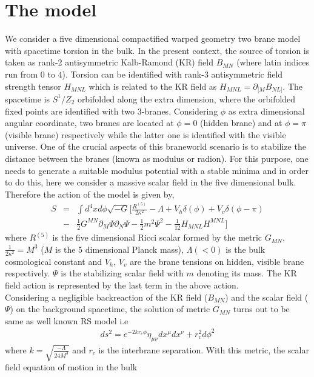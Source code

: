 \documentclass[a4paper]{article}
\begin{document}
\section{The model}
We consider a five dimensional compactified warped geometry two brane model with spacetime torsion in the bulk. In the present 
context, the source of torsion is taken as rank-2 antisymmetric Kalb-Ramond (KR) field $B_{MN}$ (where latin indices 
run from $0$ to $4$). Torsion can be identified with rank-3 antisymmetric field strength tensor $H_{MNL}$ which is related 
to the KR field as $H_{MNL}=\partial_{[M}B_{NL]}$. The spacetime is $S^1/Z_2$ orbifolded along the extra dimension, where 
the orbifolded fixed points are identified with two 3-branes. 
Considering $\phi$ as extra dimensional angular coordinate, two branes are located at $\phi=0$ (hidden brane) and at $\phi=\pi$ (visible brane) 
respectively while the latter one is identified with the visible universe. 
One of the crucial aspects of this braneworld scenario is to stabilize the distance between the branes 
(known as modulus or radion). For this purpose, one needs to generate a suitable modulus potential with a stable minima and in 
order to do this, here we consider a massive scalar field in the five dimensional bulk. Therefore the action of the model is given by, 
\begin{eqnarray}
 S&=&\int d^4xd\phi \sqrt{-G} \bigg[\frac{R^{(5)}}{2\kappa^2} - \Lambda + V_h\delta(\phi) + V_v\delta(\phi-\pi)\nonumber\\
 &-&\frac{1}{2}G^{MN}\partial_M\Psi\partial_N\Psi - \frac{1}{2}m^2\Psi^2 - \frac{1}{12}H_{MNL}H^{MNL}\bigg]
 \label{5d action}
\end{eqnarray}
where $R^{(5)}$ is the five dimensional Ricci scalar formed by the metric $G_{MN}$, $\frac{1}{2\kappa^2}=M^3$ ($M$ is the 5 dimensional 
Planck mass), $\Lambda (<0)$ is the bulk cosmological constant 
and $V_h$, $V_v$ are the brane tensions on hidden, visible brane respectively. $\Psi$ is the stabilizing scalar field with 
$m$ denoting its mass. The KR field action is represented by the last term in the above action.\\
Considering a negligible backreaction of the KR field ($B_{MN}$) and the scalar field ($\Psi$) on the background 
spacetime, the solution of metric $G_{MN}$ turns out to be same as well known RS model i.e
\begin{eqnarray}
 ds^2 = e^{-2kr_c\phi}\eta_{\mu\nu}dx^{\mu}dx^{\nu} + r_c^2d\phi^2
 \label{5d metric1}
\end{eqnarray}
where $k=\sqrt{\frac{-\Lambda}{24M^3}}$ and $r_c$ is the interbrane separation. With this metric, the scalar field equation of motion in the bulk 
\end{document}
